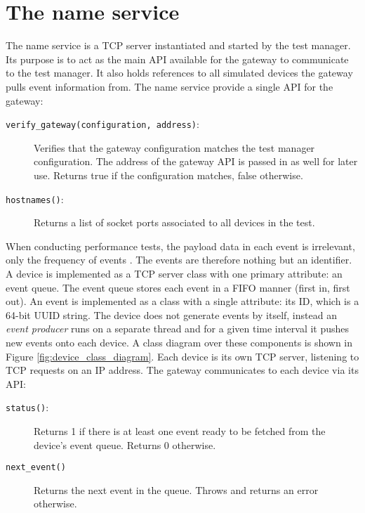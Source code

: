 \section{The name service}

The name service is a TCP server instantiated and started by the test manager.
Its purpose is to act as the main API available for the gateway to communicate
to the test manager. It also holds references to all simulated devices the
gateway pulls event information from. The name service provide a single API for
the gateway:

\begin{description}

    \item[\texttt{verify\_gateway(configuration, address)}:] Verifies that the
        gateway configuration matches the test manager configuration. The
        address of the gateway API is passed in as well for later use. Returns
        true if the configuration matches, false otherwise.

    \item[\texttt{hostnames()}:] Returns a list of socket ports associated to
        all devices in the test.

\end{description}

When conducting performance tests, the payload data in each event is
irrelevant, only the frequency of events \cite{weyuker2000experience}. The
events are therefore nothing but an identifier. A device is implemented as a
TCP server class with one primary attribute: an event queue. The event queue
stores each event in a FIFO manner (first in, first out). An event is
implemented as a class with a single attribute: its ID, which is a 64-bit UUID
string. The device does not generate events by itself, instead an \textit{event
producer} runs on a separate thread and for a given time interval it pushes new
events onto each device. A class diagram over these components is shown in
Figure \ref{fig:device_class_diagram}. Each device is its own TCP server,
listening to TCP requests on an IP address. The gateway communicates to each
device via its API:

\begin{description}

    \item[\texttt{status()}:] Returns 1 if there is at least one event ready to
        be fetched from the device's event queue. Returns 0 otherwise.

    \item[\texttt{next\_event()}] Returns the next event in the queue. Throws
        and returns an error otherwise.

\end{description}

